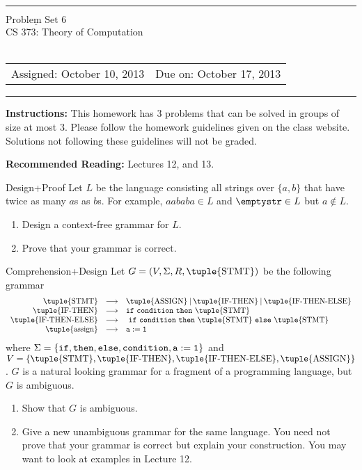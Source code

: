 \documentclass{article}
\author{}
\date{}
\begin{document}
\hrule
\begin{center}
{\LARGE \sc $\underline{\mbox{Problem Set 6}}$} \\
{\Large \sc CS 373: Theory of Computation}\\
\ \\
\begin{tabular}{ll}
Assigned: October 10, 2013 & Due on: October 17, 2013
\end{tabular}
\end{center}
\hrule

{\bf Instructions:} This homework has 3 problems that can be solved in
groups of size at most 3. Please follow the homework guidelines given
on the class website. Solutions not following these guidelines will
not be graded.

{\bf Recommended Reading:} Lectures 12, and 13.

\begin{problem}{Design+Proof}
Let $L$ be the language consisting all strings over $\{a,b\}$ that
have twice as many $a$s as $b$s. For example, $aababa \in L$ and
$\emptystr \in L$ but $a \not\in L$.
\begin{enumerate}
\item Design a context-free grammar for $L$.
\item Prove that your grammar is correct.
\end{enumerate}
\end{problem}

\begin{problem}{Comprehension+Design}
Let $G = (V,\Sigma,R,\tuple{\mbox{STMT}})$ be the following grammar
\[
\begin{array}{rcl}
\tuple{\mbox{STMT}} & \longrightarrow & \tuple{\mbox{ASSIGN}}\: |\: 
  \tuple{\mbox{IF-THEN}}\: |\: \tuple{\mbox{IF-THEN-ELSE}}\\
\tuple{\mbox{IF-THEN}} & \longrightarrow & {\tt if\ condition\ then\ } 
  \tuple{\mbox{STMT}}\\
\tuple{\mbox{IF-THEN-ELSE}} & \longrightarrow & {\tt\ if\ condition\ then\ } 
  \tuple{\mbox{STMT}}\ {\tt else\ } \tuple{\mbox{STMT}}\\
\tuple{\mbox{assign}} & \longrightarrow & {\tt a := 1}
\end{array}
\]
where $\Sigma = \{{\tt if}, {\tt then}, {\tt else}, {\tt condition},
{\tt a := 1}\}$ and $V =
\{\tuple{\mbox{STMT}},\tuple{\mbox{IF-THEN}},\tuple{\mbox{IF-THEN-ELSE}},
\tuple{\mbox{ASSIGN}}\}$. $G$ is a natural looking grammar for a
fragment of a programming language, but $G$ is ambiguous.
\begin{enumerate}
\item Show that $G$ is ambiguous.
\item Give a new unambiguous grammar for the same language. You need
  not prove that your grammar is correct but explain your
  construction. You may want to look at examples in Lecture
  12.
\end{enumerate}
\end{problem}
\end{document}
